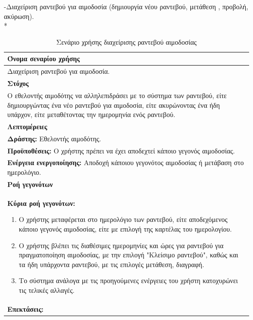 \newpage			
-Διαχείριση ραντεβού για αιμοδοσία (δημιουργία νέου ραντεβού, μετάθεση , προβολή, ακύρωση).
\\*

\begin{table}[H]
	\begin{center}
	    \begin{tabular}{|p{\dimexpr \linewidth-2\tabcolsep}|}
	    \hline
	    \rowcolor{grayy}
	    \textbf{Όνομα σεναρίου χρήσης}
	    \\ \hline    
	     Διαχείριση ραντεβού για αιμοδοσία.
	     \\ \hline
	    \rowcolor{grayy}
	    \textbf{\textbf{Στόχος}}
	    \\ \hline
	 	 Ο εθελοντής αιμοδότης να αλληλεπιδράσει με το σύστημα των ραντεβού, είτε δημιουργώντας ένα νέο ραντεβού για αιμοδοσία, είτε ακυρώνοντας ένα ήδη υπάρχον, είτε μεταθέτοντας την ημερομηνία ενός ραντεβού.
	    \\ \hline
	    \rowcolor{grayy}
	    \textbf{Λεπτομέρειες}
	    \\ \hline
		\textbf{Δράστης:} Εθελοντής αιμοδότης.
		\\*
		\textbf{Προϋποθέσεις:} Ο χρήστης πρέπει να έχει αποδεχτεί κάποιο γεγονός αιμοδοσίας.
		\\*
		\textbf{Ενέργεια ενεργοποίησης:} Αποδοχή κάποιου γεγονότος αιμοδοσίας ή μετάβαση στο ημερολόγιο.
		\\ \hline

		\rowcolor{grayy}    
	    \textbf{Ροή γεγονότων}
	    \\ \hline
		\textbf{Κύρια ροή γεγονότων:}
		\begin{enumerate}
			\item	 Ο χρήστης μεταφέρεται στο ημερολόγιο των ραντεβού, είτε αποδεχόμενος κάποιο γεγονός αιμοδοσίας, είτε με επιλογή της καρτέλας του ημερολογίου.
			\item  Ο χρήστης βλέπει τις διαθέσιμες ημερομηνίες και ώρες για ραντεβού για πραγματοποίηση αιμοδοσίας, με την επιλογή "Κλείσιμο ραντεβού", καθώς και τα ήδη υπάρχοντα ραντεβού, με τις επιλογές μετάθεση, διαγραφή.
			\item Το σύστημα ανάλογα με τις προηγούμενες ενέργειες του χρήστη κατοχυρώνει τις τελικές αλλαγές.
		\end{enumerate}
		\\ \hline
		\rowcolor{grayy}
		\textbf{Επεκτάσεις:}
		   \\ \hline
	    \end{tabular}
	    \caption{Σενάριο χρήσης διαχείρισης ραντεβού αιμοδοσίας}
	    \label{tab:blood_donation_reservation_management} 
	\end{center}
\end{table}	

